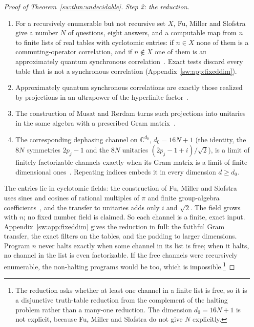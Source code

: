 \begin{proof}[Proof of Theorem~\ref{sw:thm:undecidable}]
\emph{Step 2: the reduction.}
\begin{enumerate}[label=(\alph*), leftmargin=*]
\item For a recursively enumerable but not recursive set $X$, Fu, Miller and Slofstra give a number $N$ of questions, eight answers, and a computable map from $n$ to finite lists of real tables with cyclotomic entries: if $n\in X$ none of them is a commuting-operator correlation, and if $n\notin X$ one of them is an approximately quantum synchronous correlation~\cite[Thm.~7.2]{FMS}. Exact tests discard every table that is not a synchronous correlation (Appendix~\ref{sw:app:fixeddim}).
\item Approximately quantum synchronous correlations are exactly those realized by projections in an ultrapower of the hyperfinite factor~\cite{KPS18}.
\item The construction of Musat and R{\o}rdam turns such projections into unitaries in the same algebra with a prescribed Gram matrix~\cite{MusatRordam}.
\item The corresponding dephasing channel on $\mathbb C^{d_0}$, $d_0=16N+1$ (the identity, the $8N$ symmetries $2p_j-1$ and the $8N$ unitaries $(2p_j-1+i)/\sqrt2$), is a limit of finitely factorizable channels exactly when its Gram matrix is a limit of finite-dimensional ones~\cite{Musat25}. Repeating indices embeds it in every dimension $d\ge d_0$.
\end{enumerate}
The entries lie in cyclotomic fields: the construction of Fu, Miller and Slofstra uses sines and cosines of rational multiples of $\pi$ and finite group-algebra coefficients~\cite[Sec.~7, Thm.~7.2]{FMS}, and the transfer to unitaries adds only $i$ and $\sqrt2$. The field grows with $n$; no fixed number field is claimed. So each channel is a finite, exact input. Appendix~\ref{sw:app:fixeddim} gives the reduction in full: the faithful Gram transfer, the exact filters on the tables, and the padding to larger dimensions. Program $n$ never halts exactly when some channel in its list is free; when it halts, no channel in the list is even factorizable. If the free channels were recursively enumerable, the non-halting programs would be too, which is impossible.\footnote{The reduction asks whether at least one channel in a finite list is free, so it is a disjunctive truth-table reduction from the complement of the halting problem rather than a many-one reduction. The dimension $d_0=16N+1$ is not explicit, because Fu, Miller and Slofstra do not give $N$ explicitly.}
\end{proof}

